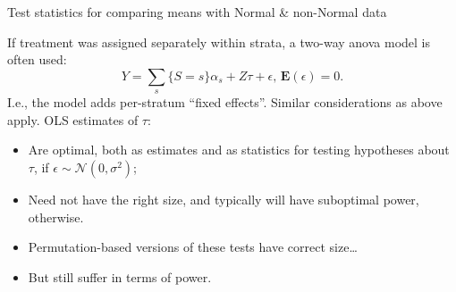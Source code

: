 \begin{frame}{Test statistics for comparing means with Normal \& non-Normal data}

If treatment was assigned separately within strata, a two-way anova model is often used:
$$
Y = \sum_{s}\{S=s\}\alpha_{s} + Z\tau + \epsilon,\, \mathbf{E}(\epsilon) = 0.
$$  
I.e., the model adds per-stratum ``fixed effects''.  Similar considerations as above apply. OLS estimates of $\tau$:
\begin{itemize}[<+->]
  \item Are optimal, both as estimates and as statistics for testing hypotheses about $\tau$, if $\epsilon \sim \mathcal{N}(0, \sigma^{2})$;
  \item Need not have the right size, and typically will have suboptimal power, otherwise.
  \item Permutation-based versions of these tests have correct size\ldots
  \item But still suffer in terms of power.
\end{itemize}

\end{frame}

